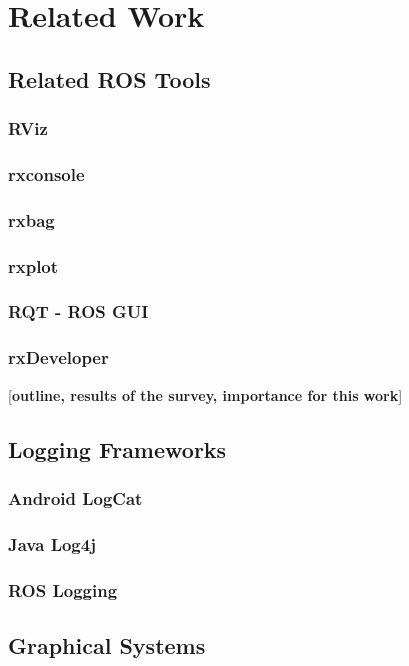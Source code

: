 \chapter{Related Work}

\section{Related ROS Tools}
\label{related_ros_tools}
\subsection{RViz}
\subsection{rxconsole}
\subsection{rxbag}
\subsection{rxplot}
\subsection{RQT - ROS GUI}
\subsection{rxDeveloper}
[\textbf{outline, results of the survey, importance for this work}]
\cite{Muellers2012}

\section{Logging Frameworks}
\subsection{Android LogCat}
\subsection{Java Log4j}
\subsection{ROS Logging}

\section{Graphical Systems}
